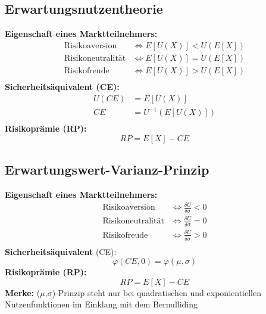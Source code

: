 \documentclass[leqno]{scrartcl}
\begin{document}
\begin{multicols}{3}
\subsection{Erwartungsnutzentheorie}

\textbf{Eigenschaft eines Marktteilnehmers:}
  \begin{equation*}
    \begin{split}
      \text{Risikoaversion}    &\Leftrightarrow E[U(X)] < U(E[X]) \\
      \text{Risikoneutralität} &\Leftrightarrow E[U(X)] = U(E[X]) \\
      \text{Risikofreude}      &\Leftrightarrow E[U(X)] > U(E[X]) \\
    \end{split}
  \end{equation*}
\textbf{Sicherheitsäquivalent (CE):}
  \begin{equation}
    \begin{split}
      U(CE) &= E[U(X)]\\
        CE &= U^{-1}(E[U(X)])\\
    \end{split}
  \end{equation}
\textbf{Risikoprämie (RP):}
  \begin{equation}
    RP = E[X] - CE
  \end{equation}

\subsection{Erwartungswert-Varianz-Prinzip}

\textbf{Eigenschaft eines Marktteilnehmers:}
  \begin{equation*}
    \begin{split}
      \text{Risikoaversion}    &\Leftrightarrow \frac{\delta U}{\delta \sigma} < 0 \\
      \text{Risikoneutralität} &\Leftrightarrow \frac{\delta U}{\delta \sigma} = 0 \\
      \text{Risikofreude}      &\Leftrightarrow \frac{\delta U}{\delta \sigma} > 0 \\
    \end{split}
  \end{equation*}
\textbf{Sicherheitsäquivalent} (CE):
  \begin{equation}
    \varphi(CE, 0) = \varphi(\mu, \sigma)
  \end{equation}
\textbf{Risikoprämie (RP):}
  \begin{equation}
    RP = E[X] - CE
  \end{equation}
\textbf{Merke:} ($\mu$,$\sigma$)-Prinzip steht nur bei quadratischen und
exponientiellen Nutzenfunktionen im Einklang mit dem Bernulliding


\end{multicols}
\end{document}
